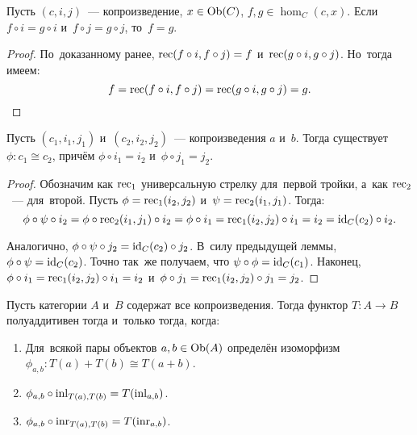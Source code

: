 \documentclass{article}
\begin{document}
\begin{lemma*}
    Пусть $(c, i, j)$~— копроизведение, $x \in \mathrm{Ob}(C)$, $f, g \in \hom_C(c, x)$.
    Если $f \circ i = g \circ i$ и~$f \circ j = g \circ j$, то~$f = g$.
\end{lemma*}

\begin{proof}
    По~доказанному ранее, $\mathrm{rec}(f \circ i, f \circ j) = f$ и~$\mathrm{rec}(g \circ i, g \circ j)$.
    Но~тогда имеем:
    $$
        f = \mathrm{rec}(f \circ i, f \circ j) = \mathrm{rec}(g \circ i, g \circ j) = g.
    $$
\end{proof}

\begin{lemma*}
    Пусть $(c_1, i_1, j_1)$ и~$(c_2, i_2, j_2)$~— копроизведения $a$ и~$b$.
    Тогда существует $\phi : c_1 \cong c_2$, причём $\phi \circ i_1 = i_2$
    и~$\phi \circ j_1 = j_2$.
\end{lemma*}

\begin{proof}
    Обозначим как $\mathrm{rec}_1$ универсальную стрелку для~первой тройки,
    а~как $\mathrm{rec}_2$~— для~второй. Пусть $\phi = \mathrm{rec}_1(i_2, j_2)$
    и~$\psi = \mathrm{rec}_2(i_1, j_1)$. Тогда:
    $$
        \phi \circ \psi \circ i_2 = \phi \circ \mathrm{rec}_2(i_1, j_1) \circ i_2
                                  = \phi \circ i_1
                                  = \mathrm{rec}_1(i_2, j_2) \circ i_1
                                  = i_2
                                  = \mathrm{id}_C(c_2) \circ i_2.
    $$

    Аналогично, $\phi \circ \psi \circ j_2 = \mathrm{id}_C(c_2) \circ j_2$.
    В~силу предыдущей леммы, $\phi \circ \psi = \mathrm{id}_C(c_2)$.
    Точно так~же получаем, что $\psi \circ \phi = \mathrm{id}_C(c_1)$.
    Наконец, $\phi \circ i_1 = \mathrm{rec}_1(i_2, j_2) \circ i_1 = i_2$
    и~$\phi \circ j_1 = \mathrm{rec}_1(i_2, j_2) \circ j_1 = j_2$.
\end{proof}

\begin{theorem*}
    Пусть категории $A$ и~$B$ содержат все копроизведения.
    Тогда функтор $T : A \rightarrow B$ полуаддитивен тогда и~только тогда, когда:
    \begin{enumerate}
        \item Для~всякой пары объектов $a, b \in \mathrm{Ob}(A)$ определён изоморфизм $\phi_{a, b} : T(a) + T(b) \cong T(a + b)$.
        \item $\phi_{a, b} \circ \mathrm{inl}_{T(a), T(b)} = T(\mathrm{inl}_{a, b})$.
        \item $\phi_{a, b} \circ \mathrm{inr}_{T(a), T(b)} = T(\mathrm{inr}_{a, b})$.
    \end{enumerate}
\end{theorem*}
\end{document}
